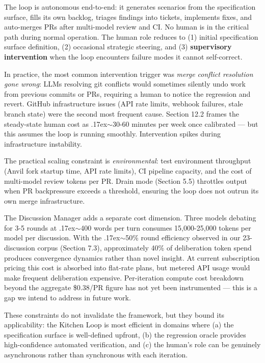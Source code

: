 \documentclass[11pt,a4paper]{article}
\newcommand{\roughly}{{\textraisebox{.17ex}{$\scriptstyle\sim$}}}
\newcommand{\textraisebox}[2]{\leavevmode\raise#1\hbox{#2}}
\begin{document}
The loop is autonomous end-to-end: it generates scenarios from the specification surface, fills its own backlog, triages findings into tickets, implements fixes, and auto-merges PRs after multi-model review and CI. No human is in the critical path during normal operation. The human role reduces to (1) initial specification surface definition, (2) occasional strategic steering, and (3) \textbf{supervisory intervention} when the loop encounters failure modes it cannot self-correct.

In practice, the most common intervention trigger was \emph{merge conflict resolution gone wrong}: LLMs resolving git conflicts would sometimes silently undo work from previous commits or PRs, requiring a human to notice the regression and revert. GitHub infrastructure issues (API rate limits, webhook failures, stale branch state) were the second most frequent cause. Section 12.2 frames the steady-state human cost as \roughly30-60 minutes per week once calibrated --- but this assumes the loop is running smoothly. Intervention spikes during infrastructure instability.

The practical scaling constraint is \emph{environmental}: test environment throughput (Anvil fork startup time, API rate limits), CI pipeline capacity, and the cost of multi-model review tokens per PR. Drain mode (Section 5.5) throttles output when PR backpressure exceeds a threshold, ensuring the loop does not outrun its own merge infrastructure.

The Discussion Manager adds a separate cost dimension. Three models debating for 3-5 rounds at \roughly400 words per turn consumes 15,000-25,000 tokens per model per discussion. With the \roughly50\% round efficiency observed in our 23-discussion corpus (Section 7.3), approximately 40\% of deliberation token spend produces convergence dynamics rather than novel insight. At current subscription pricing this cost is absorbed into flat-rate plans, but metered API usage would make frequent deliberation expensive. Per-iteration compute cost breakdown beyond the aggregate \$0.38/PR figure has not yet been instrumented --- this is a gap we intend to address in future work.

These constraints do not invalidate the framework, but they bound its applicability: the Kitchen Loop is most efficient in domains where (a) the specification surface is well-defined upfront, (b) the regression oracle provides high-confidence automated verification, and (c) the human's role can be genuinely asynchronous rather than synchronous with each iteration.
\end{document}
